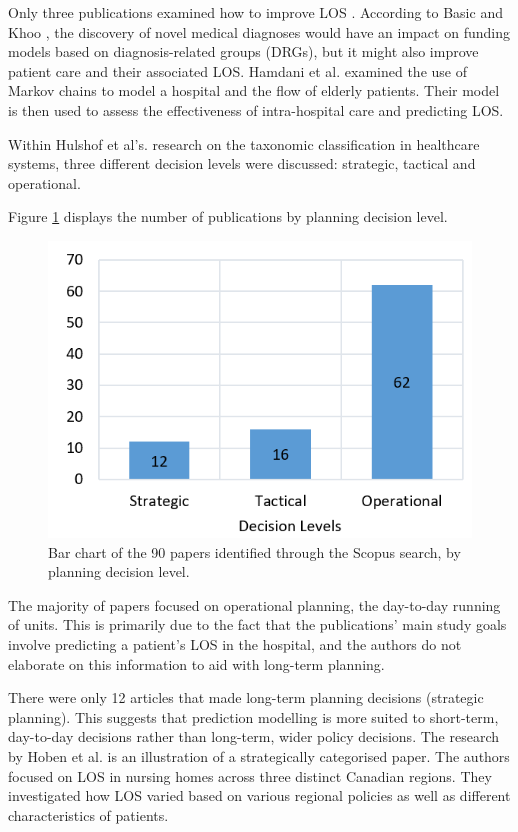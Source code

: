 \documentclass[../thesis.tex]{subfiles}
\begin{document}
Only three publications examined how to improve LOS \cite{Basic2015,Hamdani,Walsh2020}. According to Basic and Khoo \cite{Basic2015}, the discovery of novel medical diagnoses would have an impact on funding models based on diagnosis-related groups (DRGs), but it might also improve patient care and their associated LOS. Hamdani et al. \cite{Hamdani} examined the use of Markov chains to model a hospital and the flow of elderly patients. Their model is then used to assess the effectiveness of intra-hospital care and predicting LOS.

Within Hulshof et al's. \cite{PHulshof} research on the taxonomic classification in healthcare systems, three different decision levels were discussed: strategic, tactical and operational.

Figure \ref{fig:lr2decisions} displays the number of publications by planning decision level. 

\begin{figure}[h!]
    \centering
    \includegraphics[scale=1]{Chapters/Chapter2/Figures3/2lrdecision.png}
    \caption{Bar chart of the 90 papers identified through the Scopus search, by planning decision level.}
    \label{fig:lr2decisions}
\end{figure}

The majority of papers focused on operational planning, the day-to-day running of units. This is primarily due to the fact that the publications' main study goals involve predicting a patient's LOS in the hospital, and the authors do not elaborate on this information to aid with long-term planning. 

There were only 12 articles that made long-term planning decisions (strategic planning). This suggests that prediction modelling is more suited to short-term, day-to-day decisions rather than long-term, wider policy decisions. The research by Hoben et al. \cite{Hoben2019} is an illustration of a strategically categorised paper. The authors focused on LOS in nursing homes across three distinct Canadian regions. They investigated how LOS varied based on various regional policies as well as different characteristics of patients.
\end{document}
